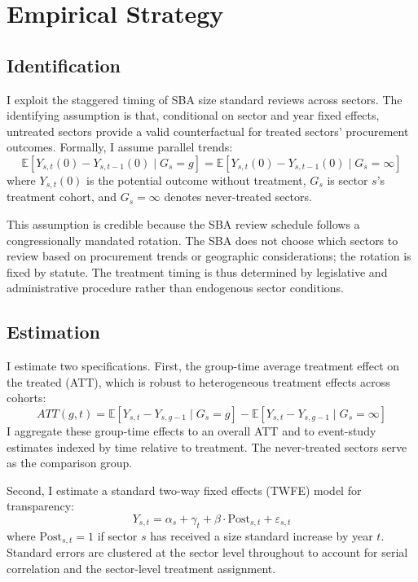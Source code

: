 \documentclass[12pt]{article}
\newcommand{\E}{\mathbb{E}}
\begin{document}
\section{Empirical Strategy}

\subsection{Identification}

I exploit the staggered timing of SBA size standard reviews across sectors. The identifying assumption is that, conditional on sector and year fixed effects, untreated sectors provide a valid counterfactual for treated sectors' procurement outcomes. Formally, I assume parallel trends:
\begin{equation}
\E[Y_{s,t}(0) - Y_{s,t-1}(0) \mid G_s = g] = \E[Y_{s,t}(0) - Y_{s,t-1}(0) \mid G_s = \infty]
\end{equation}
where $Y_{s,t}(0)$ is the potential outcome without treatment, $G_s$ is sector $s$'s treatment cohort, and $G_s = \infty$ denotes never-treated sectors.

This assumption is credible because the SBA review schedule follows a congressionally mandated rotation. The SBA does not choose which sectors to review based on procurement trends or geographic considerations; the rotation is fixed by statute. The treatment timing is thus determined by legislative and administrative procedure rather than endogenous sector conditions.

\subsection{Estimation}

I estimate two specifications. First, the \citet{callaway2021} group-time average treatment effect on the treated (ATT), which is robust to heterogeneous treatment effects across cohorts:
\begin{equation}
ATT(g,t) = \E[Y_{s,t} - Y_{s,g-1} \mid G_s = g] - \E[Y_{s,t} - Y_{s,g-1} \mid G_s = \infty]
\end{equation}
I aggregate these group-time effects to an overall ATT and to event-study estimates indexed by time relative to treatment. The never-treated sectors serve as the comparison group.

Second, I estimate a standard two-way fixed effects (TWFE) model for transparency:
\begin{equation}
Y_{s,t} = \alpha_s + \gamma_t + \beta \cdot \text{Post}_{s,t} + \varepsilon_{s,t}
\end{equation}
where $\text{Post}_{s,t} = 1$ if sector $s$ has received a size standard increase by year $t$. Standard errors are clustered at the sector level throughout to account for serial correlation and the sector-level treatment assignment.
\end{document}

